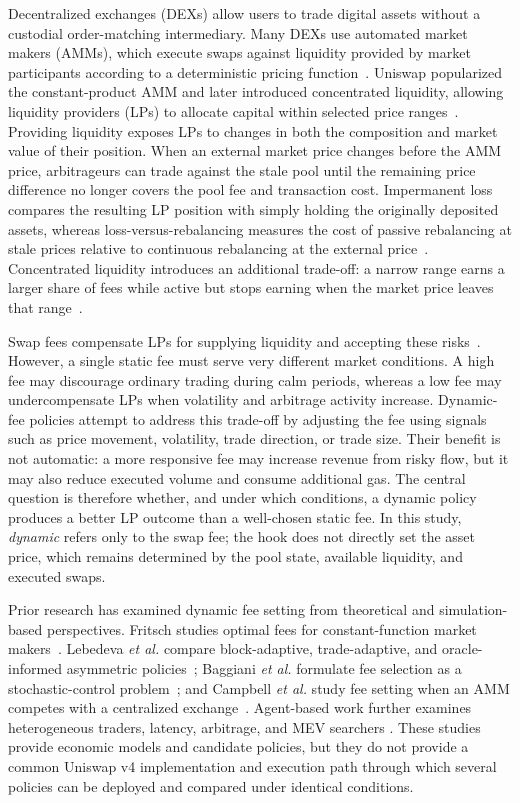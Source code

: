 \documentclass[a4paper,conference]{IEEEtran}
\begin{document}
Decentralized exchanges (DEXs) allow users to trade digital assets without a custodial order-matching intermediary. Many DEXs use automated market makers (AMMs), which execute swaps against liquidity provided by market participants according to a deterministic pricing function~\cite{angeris2019analysis,angeris2022multiasset}. Uniswap popularized the constant-product AMM and later introduced concentrated liquidity, allowing liquidity providers (LPs) to allocate capital within selected price ranges~\cite{adams2020uniswap,adams2021uniswapv3}. Providing liquidity exposes LPs to changes in both the composition and market value of their position. When an external market price changes before the AMM price, arbitrageurs can trade against the stale pool until the remaining price difference no longer covers the pool fee and transaction cost. Impermanent loss compares the resulting LP position with simply holding the originally deposited assets, whereas loss-versus-rebalancing measures the cost of passive rebalancing at stale prices relative to continuous rebalancing at the external price~\cite{milionis2022lvr}. Concentrated liquidity introduces an additional trade-off: a narrow range earns a larger share of fees while active but stops earning when the market price leaves that range~\cite{fan2021strategic}.

Swap fees compensate LPs for supplying liquidity and accepting these risks~\cite{Vlasov2025Impact}. However, a single static fee must serve very different market conditions. A high fee may discourage ordinary trading during calm periods, whereas a low fee may undercompensate LPs when volatility and arbitrage activity increase. Dynamic-fee policies attempt to address this trade-off by adjusting the fee using signals such as price movement, volatility, trade direction, or trade size. Their benefit is not automatic: a more responsive fee may increase revenue from risky flow, but it may also reduce executed volume and consume additional gas. The central question is therefore whether, and under which conditions, a dynamic policy produces a better LP outcome than a well-chosen static fee. In this study, \emph{dynamic} refers only to the swap fee; the hook does not directly set the asset price, which remains determined by the pool state, available liquidity, and executed swaps.

Prior research has examined dynamic fee setting from theoretical and simulation-based perspectives. Fritsch studies optimal fees for constant-function market makers~\cite{Fritsch_2021}. Lebedeva \emph{et al.} compare block-adaptive, trade-adaptive, and oracle-informed asymmetric policies~\cite{lebedeva2025dynamic}; Baggiani \emph{et al.} formulate fee selection as a stochastic-control problem~\cite{baggiani2025optimal}; and Campbell \emph{et al.} study fee setting when an AMM competes with a centralized exchange~\cite{campbell2025optimal}. Agent-based work further examines heterogeneous traders, latency, arbitrage, and MEV searchers \cite{dinosse2026dynamic}. These studies provide economic models and candidate policies, but they do not provide a common Uniswap v4 implementation and execution path through which several policies can be deployed and compared under identical conditions.
\end{document}

